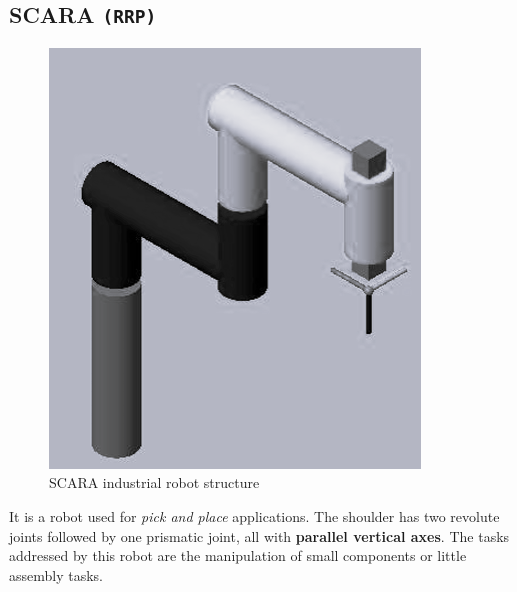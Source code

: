 \subsection{SCARA \texttt{(RRP)}}
\begin{multicols}{2}
    \begin{figure}[H]
        \centering
        \includegraphics[scale=0.5]{img/scara.png}
        \caption{SCARA industrial robot structure}
    \end{figure}
    \noindent
    It is a robot used for \textit{pick and place} applications. The shoulder has two revolute joints followed by one prismatic joint, all with \textbf{parallel vertical axes}. The tasks addressed by this robot are the manipulation of small components or little assembly tasks.
\end{multicols}

